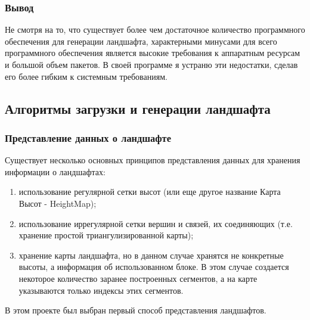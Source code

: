 \documentclass[a4paper, 10pt]{article}
\begin{document}
	\subsubsection{Вывод}
	\hspace*{5mm} Не смотря на то, что существует более чем достаточное количество программного обеспечения для генерации ландшафта, характерными минусами для всего программного обеспечения является высокие требования к аппаратным ресурсам и большой объем пакетов. В своей программе я устраню эти недостатки, сделав его более гибким к системным требованиям.
	\subsection{Алгоритмы загрузки и генерации ландшафта}
	\subsubsection{Представление данных о ландшафте}
	\hspace*{5mm} Существует несколько основных принципов представления данных для хранения информации о ландшафтах:
	\begin{enumerate}
		\item использование регулярной сетки высот (или еще другое название Карта Высот - HeightMap);
		\item использование иррегулярной сетки вершин и связей, их соединяющих (т.е. хранение простой триангулизированной карты);
		\item хранение карты ландшафта, но в данном случае хранятся не конкретные высоты, а информация об использованном блоке. В этом случае создается некоторое количество заранее построенных сегментов, а на карте указываются только индексы этих сегментов.
	\end{enumerate}

	В этом проекте был выбран первый способ представления ландшафтов.
\end{document}
